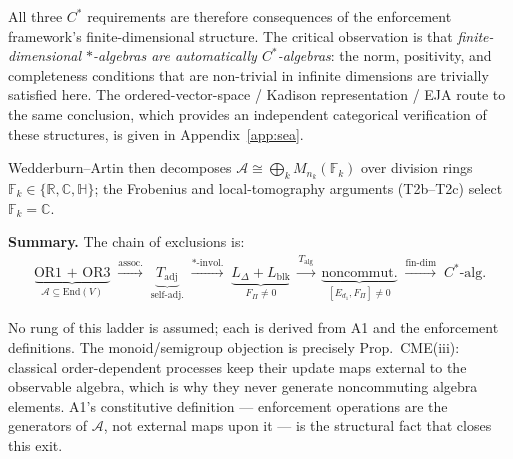 \documentclass[11pt]{article}
\theoremstyle{remark}
\begin{document}
\smallskip\noindent All three $C^*$ requirements are therefore consequences of the enforcement framework's finite-dimensional structure.  The critical observation is that \emph{finite-dimensional $*$-algebras are automatically $C^*$-algebras}: the norm, positivity, and completeness conditions that are non-trivial in infinite dimensions are trivially satisfied here.  The ordered-vector-space / Kadison representation / EJA route to the same conclusion, which provides an independent categorical verification of these structures, is given in Appendix~\ref{app:sea}.

Wedderburn--Artin then decomposes $\mathcal{A} \cong \bigoplus_k M_{n_k}(\mathbb{F}_k)$ over division rings $\mathbb{F}_k \in \{\mathbb{R}, \mathbb{C}, \mathbb{H}\}$; the Frobenius and local-tomography arguments (T2b--T2c) select $\mathbb{F}_k = \mathbb{C}$.

\smallskip\noindent\textbf{Summary.}  The chain of exclusions is:
\begin{gather*}
\underbrace{\text{OR1 + OR3}}_{\mathcal{A} \subseteq \mathrm{End}(V)}
\;\xrightarrow{\text{assoc.}}\;
\underbrace{T_{\mathrm{adj}}}_{\text{self-adj.}}
\;\xrightarrow{*\text{-invol.}}\;
\underbrace{L_\Delta + L_{\mathrm{blk}}}_{F_\Pi \ne 0}
\;\xrightarrow{T_{\mathrm{alg}}}\;
\underbrace{\text{noncommut.}}_{[E_{d_1}, F_\Pi] \ne 0}
\;\xrightarrow{\text{fin-dim}}\;
C^*\text{-alg.}
\end{gather*}

\smallskip\noindent No rung of this ladder is assumed; each is derived from A1 and the enforcement definitions.  The monoid/semigroup objection is precisely Prop.~CME(iii): classical order-dependent processes keep their update maps external to the observable algebra, which is why they never generate noncommuting algebra elements.  A1's constitutive definition --- enforcement operations are the generators of $\mathcal{A}$, not external maps upon it --- is the structural fact that closes this exit.
\end{document}

